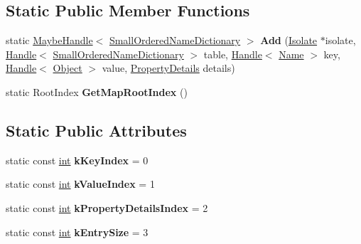 \subsection*{Static Public Member Functions}
\begin{DoxyCompactItemize}
\item 
\mbox{\label{classv8_1_1internal_1_1SmallOrderedNameDictionary_a4702ddbb53bfc90a58814b3b01275a35}} 
static \mbox{\hyperlink{classv8_1_1internal_1_1MaybeHandle}{Maybe\+Handle}}$<$ \mbox{\hyperlink{classv8_1_1internal_1_1SmallOrderedNameDictionary}{Small\+Ordered\+Name\+Dictionary}} $>$ {\bfseries Add} (\mbox{\hyperlink{classv8_1_1internal_1_1Isolate}{Isolate}} $\ast$isolate, \mbox{\hyperlink{classv8_1_1internal_1_1Handle}{Handle}}$<$ \mbox{\hyperlink{classv8_1_1internal_1_1SmallOrderedNameDictionary}{Small\+Ordered\+Name\+Dictionary}} $>$ table, \mbox{\hyperlink{classv8_1_1internal_1_1Handle}{Handle}}$<$ \mbox{\hyperlink{classv8_1_1internal_1_1Name}{Name}} $>$ key, \mbox{\hyperlink{classv8_1_1internal_1_1Handle}{Handle}}$<$ \mbox{\hyperlink{classv8_1_1internal_1_1Object}{Object}} $>$ value, \mbox{\hyperlink{classv8_1_1internal_1_1PropertyDetails}{Property\+Details}} details)
\item 
\mbox{\label{classv8_1_1internal_1_1SmallOrderedNameDictionary_adf86047a97139236d17944d91df5cf6c}} 
static Root\+Index {\bfseries Get\+Map\+Root\+Index} ()
\end{DoxyCompactItemize}
\subsection*{Static Public Attributes}
\begin{DoxyCompactItemize}
\item 
\mbox{\label{classv8_1_1internal_1_1SmallOrderedNameDictionary_a5fdcfc370e0d89e458ea2de072d22214}} 
static const \mbox{\hyperlink{classint}{int}} {\bfseries k\+Key\+Index} = 0
\item 
\mbox{\label{classv8_1_1internal_1_1SmallOrderedNameDictionary_a2195e65152aff90f9491ac22d770c36a}} 
static const \mbox{\hyperlink{classint}{int}} {\bfseries k\+Value\+Index} = 1
\item 
\mbox{\label{classv8_1_1internal_1_1SmallOrderedNameDictionary_a93a0ec374610662c89b2b9f72673634f}} 
static const \mbox{\hyperlink{classint}{int}} {\bfseries k\+Property\+Details\+Index} = 2
\item 
\mbox{\label{classv8_1_1internal_1_1SmallOrderedNameDictionary_a9e249393d0cb485fd8ff60ad907bb338}} 
static const \mbox{\hyperlink{classint}{int}} {\bfseries k\+Entry\+Size} = 3
\end{DoxyCompactItemize}
